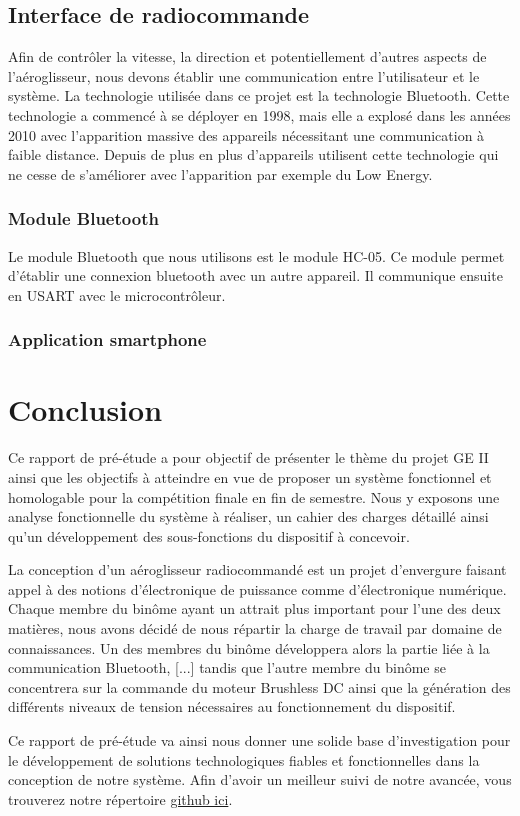 \documentclass[a4paper,12pt]{report}
\begin{document}
		\subsection{Interface de radiocommande}
			Afin de contrôler la vitesse, la direction et potentiellement d'autres aspects de l'aéroglisseur, nous devons établir une communication entre l'utilisateur et le système. La technologie utilisée dans ce projet est la technologie Bluetooth. Cette technologie a commencé à se déployer en 1998, mais elle a explosé dans les années 2010 avec l'apparition massive des appareils nécessitant une communication à faible distance. Depuis de plus en plus d'appareils utilisent cette technologie qui ne cesse de s'améliorer avec l'apparition par exemple du Low Energy.
			\subsubsection{Module Bluetooth}
			Le module Bluetooth que nous utilisons est le module HC-05. Ce module permet d'établir une connexion bluetooth avec un autre appareil. Il communique ensuite en USART avec le microcontrôleur.
			\subsubsection{Application smartphone}
	
	\section{Conclusion}
	
	Ce rapport de pré-étude a pour objectif de présenter le thème du projet GE II ainsi que les objectifs à atteindre en vue de proposer un système fonctionnel et homologable pour la compétition finale en fin de semestre. Nous y exposons une analyse fonctionnelle du système à réaliser, un cahier des charges détaillé ainsi qu'un développement des sous-fonctions du dispositif à concevoir.
	
	La conception d'un aéroglisseur radiocommandé est un projet d'envergure faisant appel à des notions d'électronique de puissance comme d'électronique numérique. Chaque membre du binôme ayant un attrait plus important pour l'une des deux matières, nous avons décidé de nous répartir la charge de travail par domaine de connaissances. Un des membres du binôme développera alors la partie liée à la communication Bluetooth, [...] tandis que l'autre membre du binôme se concentrera sur la commande du moteur Brushless DC ainsi que la génération des différents niveaux de tension nécessaires au fonctionnement du dispositif.
	
	Ce rapport de pré-étude va ainsi nous donner une solide base d'investigation pour le développement de solutions technologiques fiables et fonctionnelles dans la conception de notre système. Afin d'avoir un meilleur suivi de notre avancée, vous trouverez notre répertoire \href{https://github.com/tristanplouz/ProjetGE2}{github ici}.
	
\end{document}
